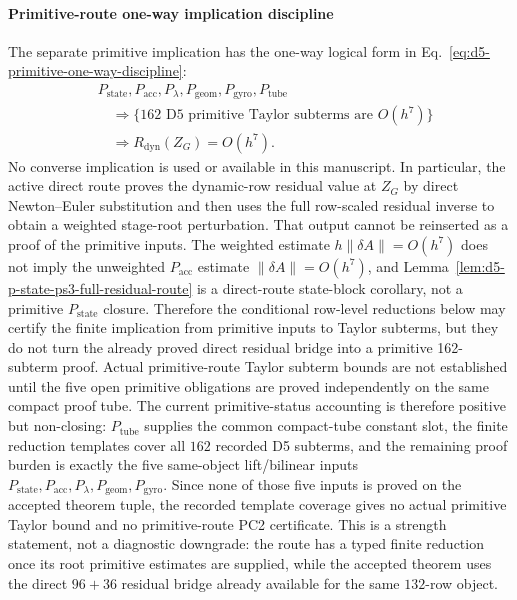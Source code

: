 \documentclass[preprint,12pt]{elsarticle}
\begin{document}
\paragraph{Primitive-route one-way implication discipline}
The separate primitive implication has the one-way logical form in
Eq.~\eqref{eq:d5-primitive-one-way-discipline}:
\begin{equation}
\label{eq:d5-primitive-one-way-discipline}
\begin{aligned}
&P_{\mathrm{state}},P_{\mathrm{acc}},P_{\lambda},
  P_{\mathrm{geom}},P_{\mathrm{gyro}},P_{\mathrm{tube}}\\
&\quad\Longrightarrow
  \{\text{162 D5 primitive Taylor subterms are }O(h^7)\}\\
&\quad\Longrightarrow R_{\mathrm{dyn}}(Z_G)=O(h^7).
\end{aligned}
\end{equation}
No converse implication is used or available in this manuscript.  In
particular, the active direct route proves the dynamic-row residual value at
\(Z_G\) by direct Newton--Euler substitution and then uses the full
row-scaled residual inverse to obtain a weighted stage-root perturbation.
That output cannot be reinserted as a proof of the primitive inputs.  The
weighted estimate \(h\|\delta A\|=O(h^7)\) does not imply the unweighted
\(P_{\mathrm{acc}}\) estimate \(\|\delta A\|=O(h^7)\), and
Lemma~\ref{lem:d5-p-state-ps3-full-residual-route} is a direct-route
state-block corollary, not a primitive \(P_{\mathrm{state}}\) closure.
Therefore the conditional row-level reductions below may certify the finite
implication from primitive inputs to Taylor subterms, but they do not turn
the already proved direct residual bridge into a primitive 162-subterm
proof.  Actual primitive-route Taylor subterm bounds are not established until
the five open primitive obligations are proved
independently on the same compact proof tube.
The current primitive-status accounting is therefore positive but
non-closing: \(P_{\mathrm{tube}}\) supplies the common compact-tube
constant slot, the finite reduction templates cover all \(162\) recorded D5
subterms, and the remaining proof burden is exactly the five same-object
lift/bilinear inputs
\(P_{\mathrm{state}},P_{\mathrm{acc}},P_{\lambda},
P_{\mathrm{geom}},P_{\mathrm{gyro}}\).
Since none of those five inputs is proved on the accepted theorem tuple, the
recorded template coverage gives no actual primitive Taylor bound and no
primitive-route PC2 certificate.  This is a strength statement, not a
diagnostic downgrade: the route has a typed finite reduction once its root
primitive estimates are supplied, while the accepted theorem uses the direct
\(96+36\) residual bridge already available for the same \(132\)-row object.
\end{document}
